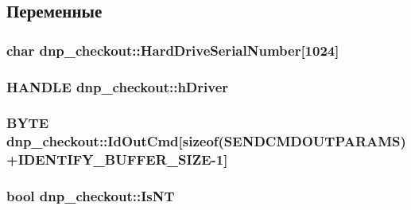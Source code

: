 \subsection{Переменные}
\hypertarget{namespacednp__checkout_ab825c7a3e95a09939ffbb11a2176661d}{
\subsubsection[{Hard\-Drive\-Serial\-Number}]{\setlength{\rightskip}{0pt plus 5cm}char dnp\-\_\-checkout\-::\-Hard\-Drive\-Serial\-Number\mbox{[}1024\mbox{]}}}\label{namespacednp__checkout_ab825c7a3e95a09939ffbb11a2176661d}
\hypertarget{namespacednp__checkout_a16349302476ed84d1abb7b6c59aa2349}{
\subsubsection[{h\-Driver}]{\setlength{\rightskip}{0pt plus 5cm}H\-A\-N\-D\-L\-E dnp\-\_\-checkout\-::h\-Driver}}\label{namespacednp__checkout_a16349302476ed84d1abb7b6c59aa2349}
\hypertarget{namespacednp__checkout_a8428f746cd3f413947a46bf6d56c6c54}{
\subsubsection[{Id\-Out\-Cmd}]{\setlength{\rightskip}{0pt plus 5cm}B\-Y\-T\-E dnp\-\_\-checkout\-::\-Id\-Out\-Cmd\mbox{[}sizeof({\bf S\-E\-N\-D\-C\-M\-D\-O\-U\-T\-P\-A\-R\-A\-M\-S})+{\bf I\-D\-E\-N\-T\-I\-F\-Y\-\_\-\-B\-U\-F\-F\-E\-R\-\_\-\-S\-I\-Z\-E}-\/1\mbox{]}}}\label{namespacednp__checkout_a8428f746cd3f413947a46bf6d56c6c54}
\hypertarget{namespacednp__checkout_a9bec63c64e9ed57aad73b0eea04a24a0}{
\subsubsection[{Is\-N\-T}]{\setlength{\rightskip}{0pt plus 5cm}bool dnp\-\_\-checkout\-::\-Is\-N\-T}}\label{namespacednp__checkout_a9bec63c64e9ed57aad73b0eea04a24a0}

